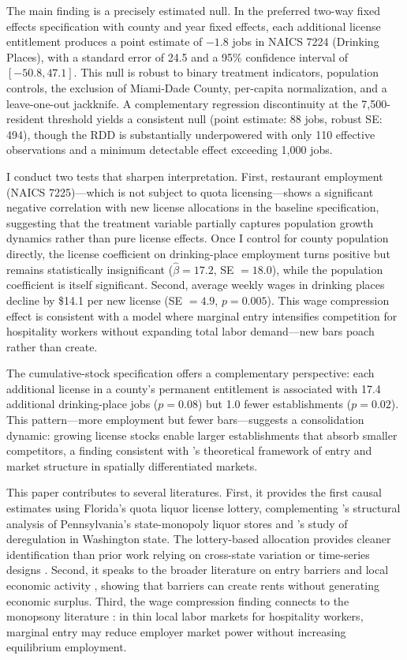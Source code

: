 \documentclass[12pt]{article}
\begin{document}
The main finding is a precisely estimated null. In the preferred two-way fixed effects specification with county and year fixed effects, each additional license entitlement produces a point estimate of $-1.8$ jobs in NAICS 7224 (Drinking Places), with a standard error of 24.5 and a 95\% confidence interval of $[-50.8, 47.1]$. This null is robust to binary treatment indicators, population controls, the exclusion of Miami-Dade County, per-capita normalization, and a leave-one-out jackknife. A complementary regression discontinuity at the 7,500-resident threshold yields a consistent null (point estimate: 88 jobs, robust SE: 494), though the RDD is substantially underpowered with only 110 effective observations and a minimum detectable effect exceeding 1,000 jobs.

I conduct two tests that sharpen interpretation. First, restaurant employment (NAICS 7225)---which is not subject to quota licensing---shows a significant negative correlation with new license allocations in the baseline specification, suggesting that the treatment variable partially captures population growth dynamics rather than pure license effects. Once I control for county population directly, the license coefficient on drinking-place employment turns positive but remains statistically insignificant ($\hat{\beta} = 17.2$, SE $= 18.0$), while the population coefficient is itself significant. Second, average weekly wages in drinking places decline by \$14.1 per new license (SE $= 4.9$, $p = 0.005$). This wage compression effect is consistent with a model where marginal entry intensifies competition for hospitality workers without expanding total labor demand---new bars poach rather than create.

The cumulative-stock specification offers a complementary perspective: each additional license in a county's permanent entitlement is associated with 17.4 additional drinking-place jobs ($p = 0.08$) but 1.0 fewer establishments ($p = 0.02$). This pattern---more employment but fewer bars---suggests a consolidation dynamic: growing license stocks enable larger establishments that absorb smaller competitors, a finding consistent with \citet{seim2006empirical}'s theoretical framework of entry and market structure in spatially differentiated markets.

This paper contributes to several literatures. First, it provides the first causal estimates using Florida's quota liquor license lottery, complementing \citet{seim2006empirical}'s structural analysis of Pennsylvania's state-monopoly liquor stores and \citet{marcus2023effects}'s study of deregulation in Washington state. The lottery-based allocation provides cleaner identification than prior work relying on cross-state variation \citep{carpenter2007heavy} or time-series designs \citep{heaton2012sunday}. Second, it speaks to the broader literature on entry barriers and local economic activity \citep{djankov2002regulation, hsieh2009misallocation}, showing that barriers can create rents without generating economic surplus. Third, the wage compression finding connects to the monopsony literature \citep{manning2003monopsony, azar2022labor}: in thin local labor markets for hospitality workers, marginal entry may reduce employer market power without increasing equilibrium employment.
\end{document}
